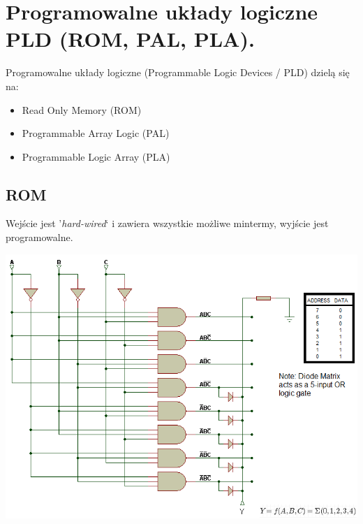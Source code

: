 \documentclass[12pt]{article}
\begin{document}
    
    \newpage
    
    \section{Programowalne układy logiczne PLD (ROM, PAL, PLA).}

    Programowalne układy logiczne (Programmable Logic Devices / PLD) dzielą się na:
    \begin{itemize}
        \item Read Only Memory (ROM)
        \item Programmable Array Logic (PAL)
        \item Programmable Logic Array (PLA)
    \end{itemize}

    \subsection{ROM}
        Wejście jest '\textit{hard-wired}` i zawiera wszystkie możliwe mintermy, wyjście jest programowalne.
            \begin{center}
                 \includegraphics[scale=0.7]{graphics/rom.png}
            \end{center}
\end{document}
